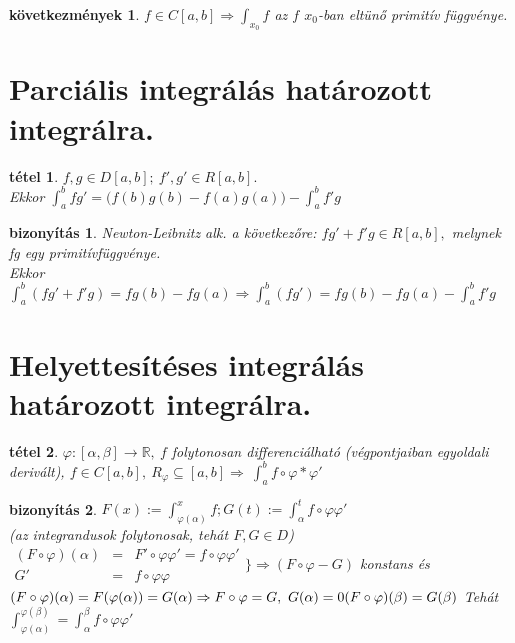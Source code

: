 \documentclass{article}
\newcommand{\R}{\mathbb{R}}
\newcommand{\n}{\rightarrow}
\newcommand{\nn}{\Rightarrow}
\newcommand{\di}{\displaystyle}
\theoremstyle{magyar}
\newtheorem{te}{tétel}[section]
\newtheorem{bi}{bizonyítás}[section]
\newtheorem{ko}{következmények}[section]
\begin{document}
\begin{ko}
  $f\in C[a,b]\nn\di\int_{x_0}f$ az $f$ $x_0$-ban eltünő primitív függvénye.
\end{ko}
\newpage
\section{Parciális integrálás határozott integrálra.}
\begin{te}
  $\di f,g\in D[a,b];~f',g'\in R[a,b].$\\
 Ekkor $\di\int_a^b{fg'}=\big(f(b)g(b)-f(a)g(a)\big)-\int_a^b{f'g}$
\end{te}
\begin{bi}
  Newton-Leibnitz alk. a következőre: $fg'+f'g\in R[a,b],$ melynek fg egy primitívfüggvénye.\\
  Ekkor $\di\int_a^b(fg'+f'g)=fg(b)-fg(a)\nn\int_a^b{(fg')}=fg(b)-fg(a)-\int_a^b{f'g}$
\end{bi}
\newpage
\section{Helyettesítéses integrálás határozott integrálra.}
\begin{te}
  $\varphi:[\alpha,\beta]\n\R,~f$ folytonosan differenciálható (végpontjaiban egyoldali derivált), $f\in C[a,b],~R_\varphi\subseteq[a,b]\nn~\di\int_a^b{f\circ\varphi*\varphi'}$
\end{te}
\begin{bi}
  $F(x):=\di\int_{\varphi(\alpha)}^xf;G(t):=\int_\alpha^t{f\circ\varphi\varphi'}$\\ (az integrandusok folytonosak, tehát $F,G \in D$)\\ $
  \begin{array}{rcl}
 (F\circ\varphi)(\alpha)&=&F'\circ\varphi\varphi'=f\circ\varphi\varphi'\\
 G'&=&f\circ\varphi\varphi
\end{array}\Big\}\nn (F\circ\varphi-G)$ konstans és\\
  $(F\circ\varphi)(\alpha)=F(\varphi(\alpha))=G(\alpha)\nn F\circ\varphi=G,~ G(\alpha)=0\\
   (F\circ\varphi)(\beta)=G(\beta)\\$
  Tehát $\di\int_{\varphi(\alpha)}^{\varphi(\beta)}=\int_\alpha^\beta{f\circ\varphi\varphi'}$
\end{bi}
\newpage
\end{document}
